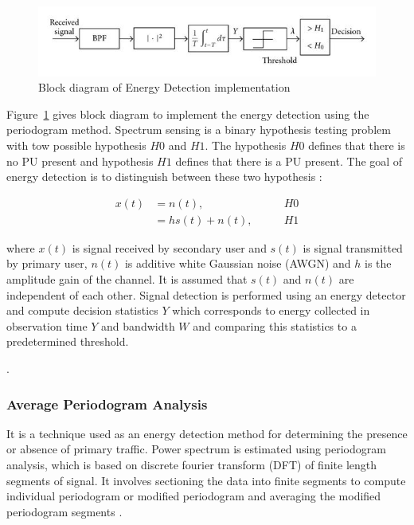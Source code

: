 \begin{figure}[h]
\centering
\includegraphics[width=1\textwidth]{energyDetector}
\caption{Block diagram of Energy Detection implementation}
\label{energyDetector}
\end{figure}




Figure~\ref{energyDetector} gives block diagram to implement the energy detection using the periodogram method.
Spectrum sensing is a binary hypothesis testing problem with tow possible hypothesis $H0$ and $H1$.
The hypothesis $H0$ defines that there is no PU present and hypothesis $H1$ defines that there is a PU present. The goal of energy detection is to distinguish between these two hypothesis \cite{sarijari09}:

\begin{align}
	x(t) &= n(t), \qquad & H0 \nonumber\\
		&= h s(t)+n(t), \qquad & H1 \nonumber
\end{align}

where $x(t)$ is signal received by secondary user and $s(t)$ is signal transmitted by primary user, $n(t)$ is additive white Gaussian noise (AWGN) and $h$ is the amplitude gain of the channel. It is assumed that $s(t)$  and $n(t)$ are independent of each other. Signal detection is performed using an energy detector and compute decision statistics $Y$ which corresponds to energy collected in observation time $Y$ and bandwidth $W$ and comparing this statistics to a predetermined threshold. 

.
\subsubsection{Average Periodogram Analysis}
 It is a technique used as an energy detection method for determining the presence or absence of primary traffic. 
Power spectrum is estimated using periodogram analysis, which is based on discrete fourier 
transform (DFT) of finite length segments of signal. It involves sectioning the data into
finite segments to compute individual periodogram or modified periodogram and averaging the modified periodogram segments \cite{welch67}.



